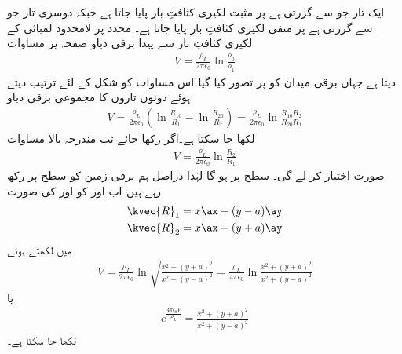 ایک تار جو  سے گزرتی ہے  پر مثبت لکیری کثافتِ بار  پایا جاتا ہے جبکہ دوسری تار جو  سے گزرتی ہے  پر منفی لکیری کثافتِ بار  پایا جاتا ہے۔ محدد پر لامحدود لمبائی کے لکیری کثافتِ بار سے پیدا برقی دباو صفحہ  پر مساوات 
\begin{align*}
V=\frac{\rho_L}{2\pi \epsilon_0} \ln \frac{\rho_0}{\rho_1}
\end{align*}
 دیتا ہے جہاں برقی میدان کو  پر تصور کیا گیا۔اس مساوات کو شکل  کے لئے ترتیب دیتے ہوئے دونوں تاروں کا مجموعی برقی دباو
\begin{align*}
V=\frac{\rho_L}{2\pi \epsilon_0}\left( \ln \frac{R_{10}}{R_1}-\ln \frac{R_{20}}{R_2} \right)=\frac{\rho_L}{2\pi \epsilon_0} \ln \frac{R_{10} R_2}{R_{20}R_1}
\end{align*}
لکھا جا سکتا ہے۔اگر  رکھا جائے تب مندرجہ بالا مساوات 
\begin{align*}
V=\frac{\rho_L}{2\pi \epsilon_0} \ln \frac{R_2}{R_1}
\end{align*}
صورت اختیار کر لے گی۔ سطح  پر  ہو گا لہٰذا دراصل ہم برقی زمین کو  سطح پر رکھ رہے ہیں۔اب  اور  کو  اور  کی صورت
\begin{align*}
\kvec{R}_1&=x\ax+(y-a)\ay\\
\kvec{R}_2&=x\ax+(y+a)\ay
\end{align*}
 میں لکھتے ہوئے
\begin{align}\label{مساوات_کپیسٹر_ہم_قوہ_سطح_کارتیسی_مساوات}
V=\frac{\rho_L}{2\pi \epsilon_0} \ln \sqrt {\frac{x^2+(y+a)^2}{x^2+(y-a)^2}}=\frac{\rho_L}{4\pi \epsilon_0} \ln \frac{x^2+(y+a)^2}{x^2+(y-a)^2}
\end{align}
یا
\begin{align}
e^{\frac{4\pi\epsilon_0 V}{\rho_L}}=\frac{x^2+(y+a)^2}{x^2+(y-a)^2}
\end{align}
لکھا جا سکتا ہے۔

